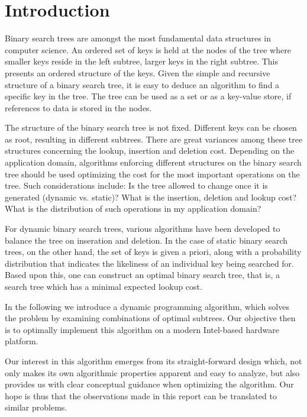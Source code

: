 \section{Introduction}\label{sec:intro}
Binary search trees are amongst the most fundamental data structures in
computer science. An ordered set of keys is held at the nodes of the tree
where smaller keys reside in the left subtree, larger keys in the right
subtree. This presents an ordered structure of the keys.  Given the simple
and recursive structure of a binary search tree, it is easy to deduce an
algorithm to find a specific key in the tree. The tree can be used as a set
or as a key-value store, if references to data is stored in the nodes.

The structure of the binary search tree is not fixed. Different keys can be
chosen as root, resulting in different subtrees. There are great variances
among these tree structures concerning the lookup, insertion and deletion
cost. Depending on the application domain, algorithms enforcing different
structures on the binary search tree should be used optimizing the cost for
the most important operations on the tree. Such considerations include: Is
the tree allowed to change once it is generated (dynamic vs. static)? What
is the insertion, deletion and lookup cost?  What is the distribution of
such operations in my application domain?

For dynamic binary search trees, various algorithms have been developed to
balance the tree on inseration and deletion. In the case of static
binary search trees, on the other hand, the set of keys is given a priori, along
with a probability distribution that indicates the likeliness of an individual
key being searched for. Based upon this, one can construct an optimal binary
search tree, that is, a search tree which has a minimal expected lookup cost.

In the following we introduce a dynamic programming algorithm, which solves the
problem by examining combinations of optimal subtrees. Our objective then is to
optimally implement this algorithm on a modern Intel-based hardware platform.

Our interest in this algorithm emerges from its straight-forward design which,
not only makes its own algorithmic properties apparent and easy to analyze, but
also provides us with clear conceptual guidance when optimizing the algorithm.
Our hope is thus that the observations made in this report can be translated to
similar problems.
